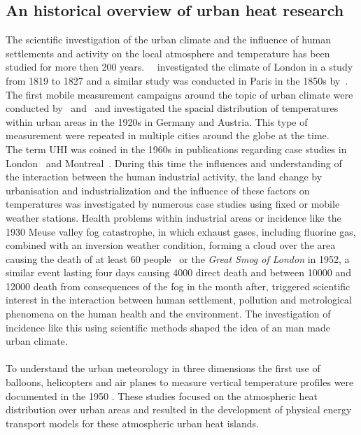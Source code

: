 \documentclass[12pt,a4paper, english,twoside]{article}
\begin{document}
 \subsection{An historical overview of urban heat research}
  The scientific investigation of the urban climate and the influence of human settlements and activity on the local atmosphere and temperature has been studied for more then 200 years.~%
  \cite{Howard1833}~investigated the climate of London in a study from 1819 to 1827 and a similar study was conducted in Paris in the 1850s by~\cite{renou1862differences}.~%
  The first mobile measurement campaigns around the topic of urban climate were conducted by~\cite{peppler1929auto} and~\cite{tollner1932untersuchungen} and investigated the spacial distribution of temperatures within urban areas  in the 1920s in Germany and Austria. 
  This type of measurement were repeated in multiple cities around the globe at the time.\\
  The term \gls{UHI} was coined in the 1960s in publications regarding case studies in London~\autocite{Chandler1961} and Montreal~\autocite{Oke1968}.
  During this time the influences and understanding of the interaction between the human industrial activity, the land change by urbanisation and industrialization and the influence of these factors on temperatures was investigated by numerous case studies using fixed or mobile weather stations.
  Health problems within industrial areas or incidence like the 1930 Meuse valley fog catastrophe, in which exhaust gases, including fluorine gas, combined with an inversion weather condition, forming a cloud over the area causing the death of at least 60 people~\autocite{Nemery2001} or 
  the \textit{Great Smog of London} in 1952, a similar event lasting four days causing 4000 direct death and between 10000 and 12000 death from consequences of the fog in the month after\autocite{Bell2004}, triggered scientific interest in the interaction between human settlement, pollution and metrological phenomena on the human health and the environment. 
  The investigation of incidence like this using scientific methods shaped the idea of an man made urban climate.\\ \\ 
%
  To understand the urban meteorology in three dimensions the first use of balloons, helicopters and air planes to measure vertical temperature profiles were documented in the 1950 \autocite{Duckworth1954}.
  These studies focused on the atmospheric heat distribution over urban areas and resulted in the development of physical energy transport models for these atmospheric urban heat islands.
\end{document}
